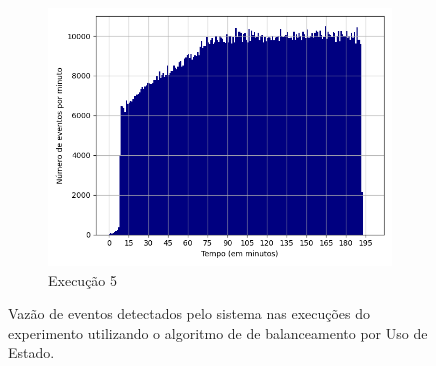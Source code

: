 \begin{figure}[p]
\begin{subfigure}{.5\textwidth}
  \includegraphics[width=\linewidth]{figuras/graphics/histogram_vazao_10-dez-su.png}  
  \caption{Execução 5}
  \label{fig:histv-10-dez-su}
\end{subfigure}
\caption{Vazão de eventos detectados pelo sistema nas  execuções do experimento utilizando o algoritmo de de balanceamento por Uso de Estado.}
\label{fig:histogram_full_SU}
\end{figure}


